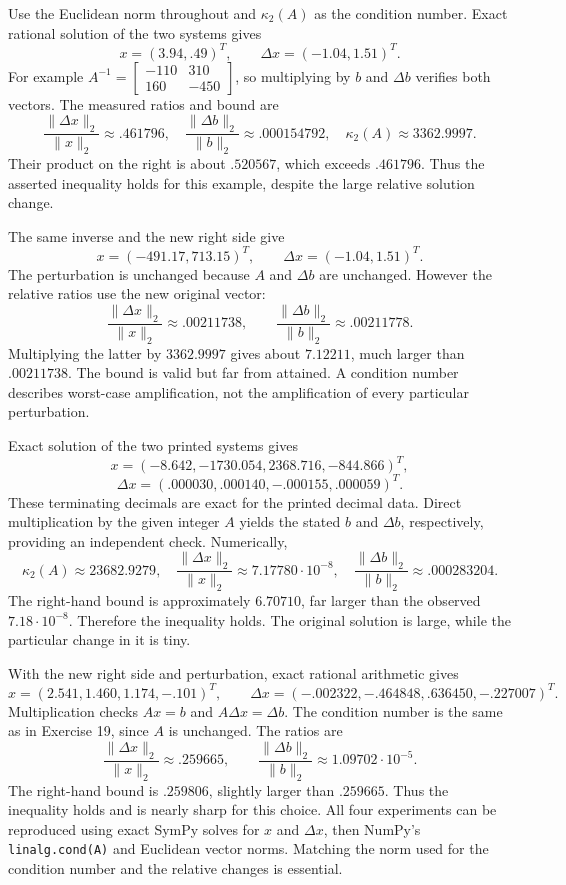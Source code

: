 Use the Euclidean norm throughout and $\kappa_2(A)$ as the condition number.
Exact rational solution of the two systems gives
\[
 x=(3.94,.49)^T,\qquad \Delta x=(-1.04,1.51)^T.
\]
For example $A^{-1}=\begin{bmatrix}-110&310\\160&-450\end{bmatrix}$,
so multiplying by $b$ and $\Delta b$ verifies both vectors.
The measured ratios and bound are
\[
 \frac{\|\Delta x\|_2}{\|x\|_2}\approx .461796,
 \quad\frac{\|\Delta b\|_2}{\|b\|_2}\approx .000154792,
 \quad\kappa_2(A)\approx3362.9997.
\]
Their product on the right is about $.520567$, which exceeds $.461796$.
Thus the asserted inequality holds for this example, despite the large
relative solution change.

The same inverse and the new right side give
\[
 x=(-491.17,713.15)^T,\qquad\Delta x=(-1.04,1.51)^T.
\]
The perturbation is unchanged because $A$ and $\Delta b$ are unchanged.
However the relative ratios use the new original vector:
\[
 \frac{\|\Delta x\|_2}{\|x\|_2}\approx .00211738,
 \qquad\frac{\|\Delta b\|_2}{\|b\|_2}\approx .00211778.
\]
Multiplying the latter by $3362.9997$ gives about $7.12211$, much
larger than $.00211738$. The bound is valid but far from attained.
A condition number describes worst-case amplification, not the amplification
of every particular perturbation.

Exact solution of the two printed systems gives
\[
 x=(-8.642,-1730.054,2368.716,-844.866)^T,
\]
\[
 \Delta x=(.000030,.000140,-.000155,.000059)^T.
\]
These terminating decimals are exact for the printed decimal data.
Direct multiplication by the given integer $A$ yields the stated $b$
and $\Delta b$, respectively, providing an independent check.
Numerically,
\[
 \kappa_2(A)\approx23682.9279,\quad
 \frac{\|\Delta x\|_2}{\|x\|_2}\approx7.17780\cdot10^{-8},\quad
 \frac{\|\Delta b\|_2}{\|b\|_2}\approx .000283204.
\]
The right-hand bound is approximately $6.70710$, far larger than the
observed $7.18\cdot10^{-8}$. Therefore the inequality holds.
The original solution is large, while the particular change in it is tiny.

With the new right side and perturbation, exact rational arithmetic gives
\[
 x=(2.541,1.460,1.174,-.101)^T,
 \qquad\Delta x=(-.002322,-.464848,.636450,-.227007)^T.
\]
Multiplication checks $Ax=b$ and $A\Delta x=\Delta b$.
The condition number is the same as in Exercise 19, since $A$ is unchanged.
The ratios are
\[
 \frac{\|\Delta x\|_2}{\|x\|_2}\approx .259665,\qquad
 \frac{\|\Delta b\|_2}{\|b\|_2}\approx1.09702\cdot10^{-5}.
\]
The right-hand bound is $.259806$, slightly larger than $.259665$.
Thus the inequality holds and is nearly sharp for this choice.
All four experiments can be reproduced using exact SymPy solves for $x$
and $\Delta x$, then NumPy's \texttt{linalg.cond(A)} and Euclidean
vector norms. Matching the norm used for the condition number and the
relative changes is essential.
